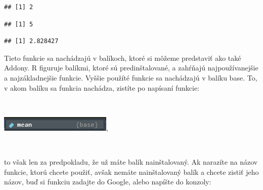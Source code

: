 \begin{verbatim}
## [1] 2
\end{verbatim}

\begin{Shaded}
\begin{Highlighting}[]
\NormalTok{(}\OperatorTok{-}\NormalTok{)}
\end{Highlighting}
\end{Shaded}

\begin{verbatim}
## [1] 5
\end{verbatim}

\begin{Shaded}
\begin{Highlighting}[]
\NormalTok{(}\NormalTok{)}
\end{Highlighting}
\end{Shaded}

\begin{verbatim}
## [1] 2.828427
\end{verbatim}

Tieto funkcie sa nachádzajú v balíkoch, ktoré si môžeme predstaviť ako
také Addony. R figuruje balíkmi, ktoré sú predinštalované, a zahŕňajú
najpoužívanejšie a najzákladnejšie funkcie. Vyššie použíté funkcie sa
nachádzajú v balíku base. To, v akom balíku sa funkcia nachádza, zistíte
po napísaní funkcie:

~

\begin{center}

\includegraphics{diplomka obrazky/1.png},

\end{center}

~

to však len za predpokladu, že už máte balík nainštalovaný. Ak narazíte
na názov funkcie, ktorú chcete použiť, avšak nemáte nainštalovaný balík
a chcete zistiť jeho názov, buď si funkciu zadajte do Google, alebo
napíšte do konzoly:

\begin{Shaded}
\begin{Highlighting}[]
\end{Highlighting}
\end{Shaded}

